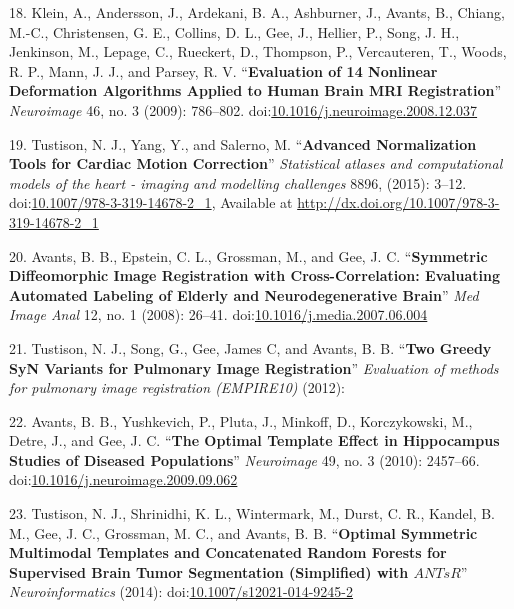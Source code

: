 \documentclass[11pt,]{article}
\begin{document}
\hypertarget{ref-Klein:2009aa}{}
18. Klein, A., Andersson, J., Ardekani, B. A., Ashburner, J., Avants,
B., Chiang, M.-C., Christensen, G. E., Collins, D. L., Gee, J., Hellier,
P., Song, J. H., Jenkinson, M., Lepage, C., Rueckert, D., Thompson, P.,
Vercauteren, T., Woods, R. P., Mann, J. J., and Parsey, R. V.
``\textbf{Evaluation of 14 Nonlinear Deformation Algorithms Applied to
Human Brain MRI Registration}'' \emph{Neuroimage} 46, no. 3 (2009):
786--802.
doi:\href{https://doi.org/10.1016/j.neuroimage.2008.12.037}{10.1016/j.neuroimage.2008.12.037}

\hypertarget{ref-Tustison:2015ab}{}
19. Tustison, N. J., Yang, Y., and Salerno, M. ``\textbf{Advanced
Normalization Tools for Cardiac Motion Correction}'' \emph{Statistical
atlases and computational models of the heart - imaging and modelling
challenges} 8896, (2015): 3--12.
doi:\href{https://doi.org/10.1007/978-3-319-14678-2_1}{10.1007/978-3-319-14678-2\_1},
Available at \url{http://dx.doi.org/10.1007/978-3-319-14678-2_1}

\hypertarget{ref-Avants:2008aa}{}
20. Avants, B. B., Epstein, C. L., Grossman, M., and Gee, J. C.
``\textbf{Symmetric Diffeomorphic Image Registration with
Cross-Correlation: Evaluating Automated Labeling of Elderly and
Neurodegenerative Brain}'' \emph{Med Image Anal} 12, no. 1 (2008):
26--41.
doi:\href{https://doi.org/10.1016/j.media.2007.06.004}{10.1016/j.media.2007.06.004}

\hypertarget{ref-Tustison:2012aa}{}
21. Tustison, N. J., Song, G., Gee, James C, and Avants, B. B.
``\textbf{Two Greedy SyN Variants for Pulmonary Image Registration}''
\emph{Evaluation of methods for pulmonary image registration (EMPIRE10)}
(2012):

\hypertarget{ref-Avants:2010aa}{}
22. Avants, B. B., Yushkevich, P., Pluta, J., Minkoff, D., Korczykowski,
M., Detre, J., and Gee, J. C. ``\textbf{The Optimal Template Effect in
Hippocampus Studies of Diseased Populations}'' \emph{Neuroimage} 49, no.
3 (2010): 2457--66.
doi:\href{https://doi.org/10.1016/j.neuroimage.2009.09.062}{10.1016/j.neuroimage.2009.09.062}

\hypertarget{ref-Tustison:2014aa}{}
23. Tustison, N. J., Shrinidhi, K. L., Wintermark, M., Durst, C. R.,
Kandel, B. M., Gee, J. C., Grossman, M. C., and Avants, B. B.
``\textbf{Optimal Symmetric Multimodal Templates and Concatenated Random
Forests for Supervised Brain Tumor Segmentation (Simplified) with
\(ANTsR\)}'' \emph{Neuroinformatics} (2014):
doi:\href{https://doi.org/10.1007/s12021-014-9245-2}{10.1007/s12021-014-9245-2}
\end{document}
